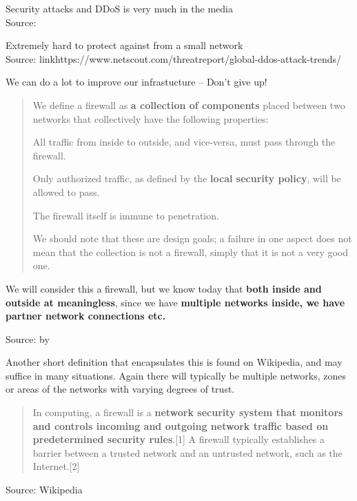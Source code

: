 \documentclass[Screen16to9,17pt]{foils}
\begin{document}
Security attacks and DDoS is very much in the media\\
Source: 



Extremely hard to protect against from a small network\\
Source: link{https://www.netscout.com/threatreport/global-ddos-attack-trends/}

We can do a lot to improve our infrastucture -- Don't give up!


\begin{quote}
We define a firewall as {\bf a collection of components} placed between two networks that collectively have
the following properties:
\begin{list2}
\item All traffic from inside to outside, and vice-versa, must pass through the firewall.
\item Only authorized traffic, as defined by the {\bf local security policy}, will be allowed to pass.
\item The firewall itself is immune to penetration.
\end{list2}
We should note that these are design goals; a failure in one aspect does not mean that the collection
is not a firewall, simply that it is not a very good one.
\end{quote}

We will consider this a firewall, but we know today that {\bf both inside and outside at meaningless}, since we have {\bf multiple networks inside, we have partner network connections etc.}

Source:  by \citeauthor{Cheswick94} \citeyear{Cheswick94}


Another short definition that encapsulates this is found on Wikipedia, and may suffice in many situations. Again there will typically be multiple networks, zones or areas of the networks with varying degrees of trust.
\begin{quote}
In computing, a firewall is a {\bf network security system that monitors and controls incoming and outgoing network traffic based on predetermined security rules}.[1] A firewall typically establishes a barrier between a trusted network and an untrusted network, such as the Internet.[2]
\end{quote}
Source: Wikipedia
\end{document}
